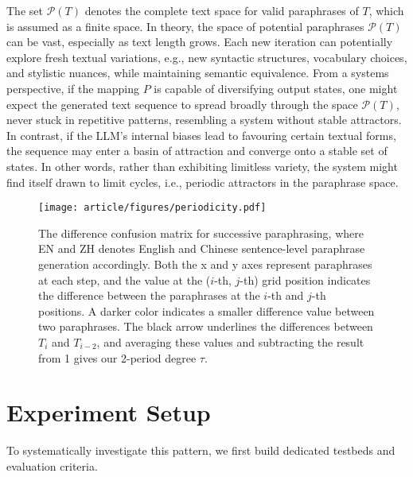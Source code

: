 The set $\mathcal{P}(T)$ denotes the complete text space for valid paraphrases of $T$, which is assumed as a finite space.
In theory, the space of potential paraphrases $\mathcal{P}(T)$ can be vast, especially as text length grows. 
Each new iteration can potentially explore fresh textual variations, e.g., new syntactic structures, vocabulary choices, and stylistic nuances, while maintaining semantic equivalence.
From a systems perspective, if the mapping $P$ is capable of diversifying output states, one might expect the generated text sequence to spread broadly through the space $\mathcal{P}(T)$, never stuck in repetitive patterns, resembling a system without stable attractors. 
In contrast, if the LLM’s internal biases lead to favouring certain textual forms, the sequence may enter a basin of attraction and converge onto a stable set of states. 
In other words, rather than exhibiting limitless variety, the system might find itself drawn to limit cycles, i.e., periodic attractors in the paraphrase space.



\begin{figure*}[t!]
    \centering
    \texttt{[image: article/figures/periodicity.pdf]}
    \caption{The difference confusion matrix for successive paraphrasing, where EN and ZH denotes English and Chinese sentence-level paraphrase generation accordingly. Both the x and y axes represent paraphrases at each step, and the value at the ($i$-th, $j$-th) grid position indicates the difference between the paraphrases at the $i$-th and $j$-th positions. 
    A darker color indicates a smaller difference value between two paraphrases. 
    The black arrow underlines the differences between \(T_i\) and \(T_{i-2}\), and averaging these values and subtracting the result from 1 gives our 2-period degree $\tau$.
    } 
    \label{figs:periodicity}
\end{figure*}



\section{Experiment Setup}
To systematically investigate this pattern, we first build dedicated testbeds and evaluation criteria.
